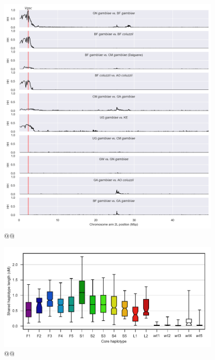 \documentclass[a4paper,11pt,abstracton,hidelinks]{scrartcl}
\begin{document}
\clearpage
\begin{figure}[t!]
\centering
\includegraphics[width=1.1\linewidth,center]{artwork/chapter6/xphh.png}
\caption{@@
}
\label{fig:xphh}
\end{figure}


\clearpage
\begin{figure}[t!]
\centering
\includegraphics[width=1.1\linewidth,center]{artwork/chapter6/pspd.pdf}
\caption{@@
}
\label{fig:pspd}
\end{figure}
\end{document}
